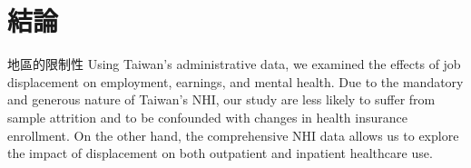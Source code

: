 \documentclass[12pt]{article}
\begin{document}
\section{結論}\label{conclusion}

地區的限制性 Using Taiwan's administrative data, we examined the effects of job displacement on employment, earnings, and mental health. Due to the mandatory and generous nature of Taiwan's NHI, our study are less likely to suffer from sample attrition and to be confounded with changes in health insurance enrollment. On the other hand, the comprehensive NHI data allows us to explore the impact of displacement on both outpatient and inpatient healthcare use.








\end{document}
